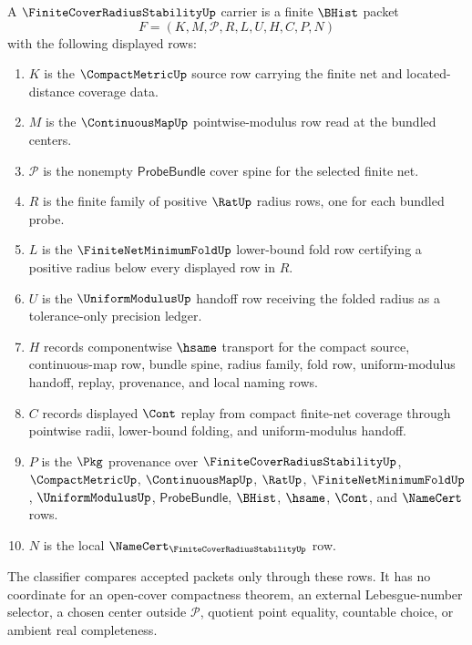 \begin{definition}
\label{def:finite-cover-radius-stability-carrier}
A $\FiniteCoverRadiusStabilityUp$ carrier is a finite $\BHist$ packet
$$
F=(K,M,\mathcal{P},R,L,U,H,C,P,N)
$$
with the following displayed rows:
\begin{enumerate}
\item $K$ is the $\CompactMetricUp$ source row carrying the finite net and located-distance coverage data.
\item $M$ is the $\ContinuousMapUp$ pointwise-modulus row read at the bundled centers.
\item $\mathcal{P}$ is the nonempty $\mathsf{ProbeBundle}$ cover spine for the selected finite net.
\item $R$ is the finite family of positive $\RatUp$ radius rows, one for each bundled probe.
\item $L$ is the $\FiniteNetMinimumFoldUp$ lower-bound fold row certifying a positive radius below every displayed row in $R$.
\item $U$ is the $\UniformModulusUp$ handoff row receiving the folded radius as a tolerance-only precision ledger.
\item $H$ records componentwise $\hsame$ transport for the compact source, continuous-map row, bundle spine, radius family, fold row, uniform-modulus handoff, replay, provenance, and local naming rows.
\item $C$ records displayed $\Cont$ replay from compact finite-net coverage through pointwise radii, lower-bound folding, and uniform-modulus handoff.
\item $P$ is the $\Pkg$ provenance over $\FiniteCoverRadiusStabilityUp$, $\CompactMetricUp$, $\ContinuousMapUp$, $\RatUp$, $\FiniteNetMinimumFoldUp$, $\UniformModulusUp$, $\mathsf{ProbeBundle}$, $\BHist$, $\hsame$, $\Cont$, and $\NameCert$ rows.
\item $N$ is the local $\NameCert_{\FiniteCoverRadiusStabilityUp}$ row.
\end{enumerate}
The classifier compares accepted packets only through these rows. It has no coordinate for an open-cover compactness theorem, an external Lebesgue-number selector, a chosen center outside $\mathcal{P}$, quotient point equality, countable choice, or ambient real completeness.
\end{definition}

